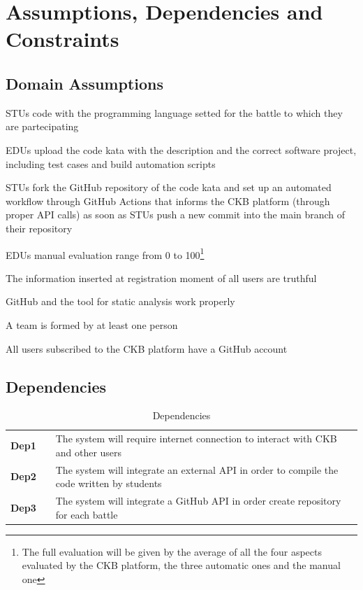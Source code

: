 \section{Assumptions, Dependencies and Constraints}

\subsection{Domain Assumptions}
\begin{assumptionsenumerate}
    \item STUs code with the programming language setted for the battle to which they are partecipating
    \item EDUs upload the code kata with the description and the correct software project, including test cases and build automation scripts
    \item STUs fork the GitHub repository of the code kata and set up an automated workflow through GitHub Actions that informs the CKB platform (through proper API calls) as soon as STUs push a new commit into the main branch of their repository
    \item EDUs manual evaluation range from 0 to 100\footnote{The full evaluation will be given by the average of all the four aspects evaluated by the CKB platform, the three automatic ones and the manual one}
    \item The information inserted at registration moment of all users are truthful
    \item GitHub and the tool for static analysis work properly
    \item A team is formed by at least one person
    \item All users subscribed to the CKB platform have a GitHub account
\end{assumptionsenumerate}

\subsection{Dependencies}
\begin{table}[H]
    \centering
    \renewcommand{\arraystretch}{1.5}
    \begin{tabular}{l l p{11.5cm}}
        \hline
        \textbf{Dep1} &  & The system will require internet connection to interact with CKB and other users           \\
        \textbf{Dep2} &  & The system will integrate an external API in order to compile the code written by students \\
        \textbf{Dep3} &  & The system will integrate a GitHub API in order create repository for each battle          \\
        \hline
    \end{tabular}
    \caption{Dependencies}
\end{table}

